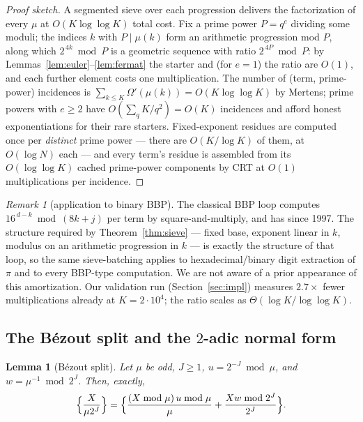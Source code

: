 \documentclass[11pt]{article}
\newtheorem{lemma}[theorem]{Lemma}
\theoremstyle{remark}
\newtheorem{remark}[theorem]{Remark}
\theoremstyle{definition}
\begin{document}
\begin{proof}[Proof sketch]
A segmented sieve over each progression delivers the factorization of
every $\mu$ at $O(K\log\log K)$ total cost. Fix a prime power $P=q^{e}$
dividing some moduli; the indices $k$ with $P\mid \mu(k)$ form an
arithmetic progression mod $P$, along which $2^{\,4k}\bmod P$ is a
geometric sequence with ratio $2^{\,4P}\bmod P$: by
Lemmas~\ref{lem:euler}--\ref{lem:fermat} the starter and (for $e=1$) the
ratio are $O(1)$, and each further element costs one multiplication. The
number of (term, prime-power) incidences is
$\sum_{k\le K}\Omega'(\mu(k))=O(K\log\log K)$ by Mertens; prime powers
with $e\ge2$ have $O(\sum_q K/q^{2})=O(K)$ incidences and afford honest
exponentiations for their rare starters. Fixed-exponent residues are
computed once per \emph{distinct} prime power --- there are
$O(K/\log K)$ of them, at $O(\log N)$ each --- and every term's residue is
assembled from its $O(\log\log K)$ cached prime-power components by CRT
at $O(1)$ multiplications per incidence.
\end{proof}

\begin{remark}[application to binary BBP]
The classical BBP loop computes $16^{\,d-k}\bmod(8k+j)$ per term by
square-and-multiply, and has since 1997. The structure required by
Theorem~\ref{thm:sieve} --- fixed base, exponent linear in $k$, modulus on
an arithmetic progression in $k$ --- is exactly the structure of that
loop, so the same sieve-batching applies to hexadecimal/binary digit
extraction of $\pi$ and to every BBP-type computation. We are not aware
of a prior appearance of this amortization. Our validation run
(Section~\ref{sec:impl}) measures $2.7\times$ fewer multiplications
already at $K=2\cdot10^{4}$; the ratio scales as
$\Theta(\log K/\log\log K)$.
\end{remark}

\subsection{The B\'ezout split and the $2$-adic normal form}\label{sec:bezout}

\begin{lemma}[B\'ezout split]\label{lem:bezout}
Let $\mu$ be odd, $J\ge1$, $u=2^{-J}\bmod\mu$, and
$w=\mu^{-1}\bmod 2^{J}$. Then, exactly,
\[
\Bigl\{\frac{X}{\mu 2^{J}}\Bigr\}
=\Bigl\{\frac{(X\bmod\mu)\,u\bmod\mu}{\mu}
+\frac{Xw\bmod 2^{J}}{2^{J}}\Bigr\}.
\]
\end{lemma}
\end{document}
